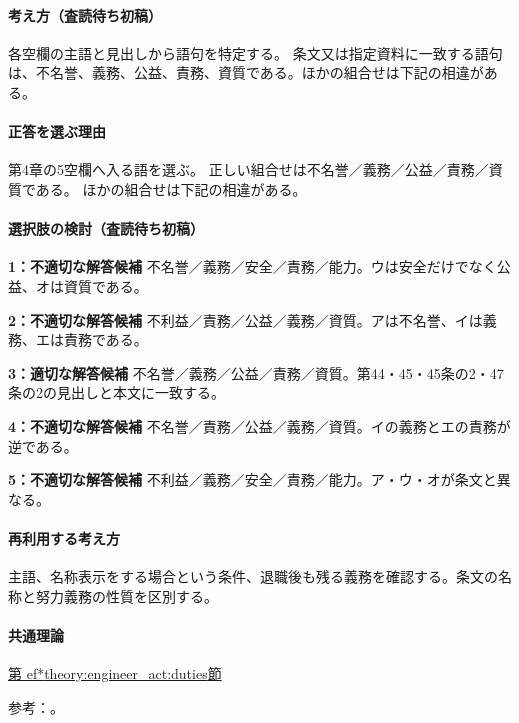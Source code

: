 \paragraph{考え方（査読待ち初稿）} 各空欄の主語と見出しから語句を特定する。 条文又は指定資料に一致する語句は、不名誉、義務、公益、責務、資質である。ほかの組合せは下記の相違がある。

\paragraph{正答を選ぶ理由} 第4章の5空欄へ入る語を選ぶ。 正しい組合せは不名誉／義務／公益／責務／資質である。 ほかの組合せは下記の相違がある。

\paragraph{選択肢の検討（査読待ち初稿）}

\noindent\textbf{1：不適切な解答候補} 不名誉／義務／安全／責務／能力。ウは安全だけでなく公益、オは資質である。\par

\noindent\textbf{2：不適切な解答候補} 不利益／責務／公益／義務／資質。アは不名誉、イは義務、エは責務である。\par

\noindent\textbf{3：適切な解答候補} 不名誉／義務／公益／責務／資質。第44・45・45条の2・47条の2の見出しと本文に一致する。\par

\noindent\textbf{4：不適切な解答候補} 不名誉／責務／公益／義務／資質。イの義務とエの責務が逆である。\par

\noindent\textbf{5：不適切な解答候補} 不利益／義務／安全／責務／能力。ア・ウ・オが条文と異なる。\par

\paragraph{再利用する考え方} 主語、名称表示をする場合という条件、退職後も残る義務を確認する。条文の名称と努力義務の性質を区別する。

\paragraph{共通理論} \hyperref[theory:engineer_act:duties]{第
ef*{theory:engineer_act:duties}節}

\par 参考：\cite{engineer_act_current}。

